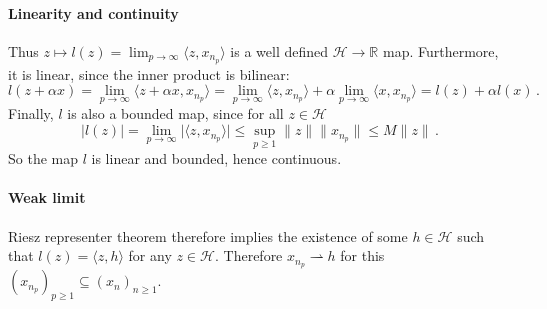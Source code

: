 \documentclass[a4paper]{article}
\newcommand{\Hcal}{\mathcal{H}}
\newcommand{\real}{\mathbb{R}}
\begin{document}

\paragraph{Linearity and continuity} %
\label{par:linearity_and_continuity}
 
Thus $z\mapsto l(z) = \lim_{p\to\infty} \langle z, x_{n_p} \rangle$ is a well defined
$\Hcal \to \real$ map. Furthermore, it is linear, since the inner product is bilinear:
\begin{equation*}
  l(z + \alpha x)
    = \lim_{p\to\infty} \langle z + \alpha x, x_{n_p} \rangle
    = \lim_{p\to\infty} \langle z, x_{n_p} \rangle
    + \alpha \lim_{p\to\infty} \langle x, x_{n_p} \rangle
    = l(z) + \alpha l(x)
    \,.
\end{equation*}
Finally, $l$ is also a bounded map, since for all $z\in \Hcal$
\begin{equation*}
  \lvert l(z) \rvert
    = \lim_{p\to\infty} \lvert \langle z, x_{n_p} \rangle \rvert
    \leq \sup_{p\geq 1} \|z\| \| x_{n_p}\|
    \leq M \|z\|
    \,.
\end{equation*}
So the map $l$ is linear and bounded, hence continuous.


\paragraph{Weak limit} %
\label{par:weak_limit}

Riesz representer theorem therefore implies the existence of some $h\in \Hcal$ such
that $l(z) = \langle z, h\rangle$ for any $z\in \Hcal$. Therefore $x_{n_p} \rightharpoonup
h$ for this $(x_{n_p})_{p\geq 1} \subseteq (x_n)_{n\geq 1}$.


\end{document}
